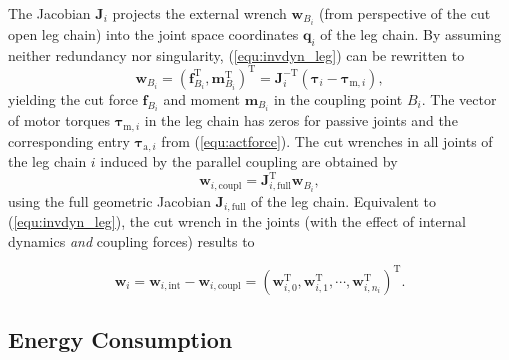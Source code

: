\documentclass[fleqn,a4paper,10pt]{article}
\newcommand{\bm}[1]{\mathbf{#1}}
\newcommand{\transp}[0]{{\mathrm{T}}}
\begin{document}
\begin{multicols}{2}
%
The Jacobian $\bm{J}_{i}$ projects the external wrench $\bm{w}_{B_i}$ (from perspective of the cut open leg chain) into the joint space coordinates $\bm{q}_i$ of the leg chain.
By assuming neither redundancy nor singularity, (\ref{equ:invdyn_leg}) can be rewritten to
%
\begin{equation}
\bm{w}_{B_i}
=
(\bm{f}_{B_i}^\transp, \bm{m}_{B_i}^\transp)^\transp
=
\bm{J}_{i}^{-\transp} (\bm{\tau}_{i} - \bm{\tau}_{\mathrm{m},i}),
\label{equ:coupling_wrench_leg}
\end{equation}
%
yielding the cut force $\bm{f}_{B_i}$ and moment $\bm{m}_{B_i}$ in the coupling point $B_i$.
The vector of motor torques $\bm{\tau}_{\mathrm{m},i}$ in the leg chain has zeros for passive joints and the corresponding entry $\bm{\tau}_{\mathrm{a},i}$ from (\ref{equ:actforce}).
The cut wrenches in all joints of the leg chain $i$ induced by the parallel coupling are obtained by
%
\begin{equation}
\bm{w}_{i,\mathrm{coupl}}=\bm{J}_{i,\mathrm{full}}^{\transp} \bm{w}_{B_i},
\label{equ:intforce_fromcoupling}
\end{equation}
%
using the full geometric Jacobian $\bm{J}_{i,\mathrm{full}}$ of the leg chain.
Equivalent to (\ref{equ:invdyn_leg}), the cut wrench in the joints (with the effect of internal dynamics \emph{and} coupling forces) results to

\begin{equation}
\bm{w}_{i} 
= 
\bm{w}_{i,\mathrm{int}} - \bm{w}_{i,\mathrm{coupl}}
=
(\bm{w}_{i,0}^\transp,\bm{w}_{i,1}^\transp,\cdots,\bm{w}_{i,n_i}^\transp)^\transp.
\label{equ:intforce_total}
\end{equation}

\subsection{Energy Consumption}
\label{sec:energy}


\end{multicols}
\end{document}
